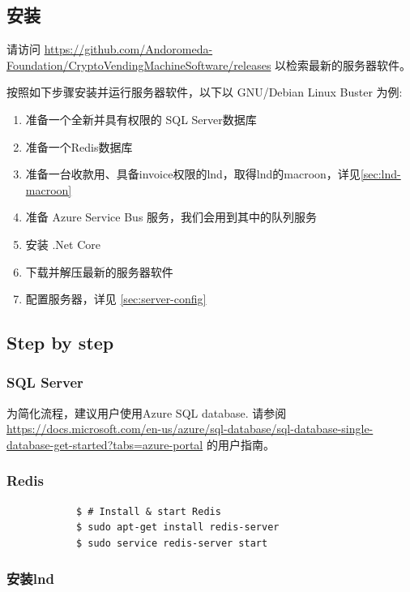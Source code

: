 \documentclass[a4paper,11pt]{article}
\theoremstyle{definition}
\begin{document}
\subsection{安装}

请访问 \url{https://github.com/Andoromeda-Foundation/CryptoVendingMachineSoftware/releases} 以检索最新的服务器软件。

按照如下步骤安装并运行服务器软件，以下以 GNU/Debian Linux Buster 为例:

    \begin{enumerate}
        \item 准备一个全新并具有权限的 SQL Server数据库
        \item 准备一个Redis数据库
        \item 准备一台收款用、具备invoice权限的lnd，取得lnd的macroon，详见\ref{sec:lnd-macroon}
        \item 准备 Azure Service Bus 服务，我们会用到其中的队列服务
        \item 安装 .Net Core
        \item 下载并解压最新的服务器软件
        \item 配置服务器，详见 \ref{sec:server-config}
    \end{enumerate}

\subsection{Step by step}
    \subsubsection{SQL Server}
    为简化流程，建议用户使用Azure SQL database. 请参阅 \url{https://docs.microsoft.com/en-us/azure/sql-database/sql-database-single-database-get-started?tabs=azure-portal} 的用户指南。
    
    \subsubsection{Redis}
        \begin{lstlisting}
            $ # Install & start Redis
            $ sudo apt-get install redis-server
            $ sudo service redis-server start
        \end{lstlisting}

    \subsubsection{安装lnd}
\end{document}
